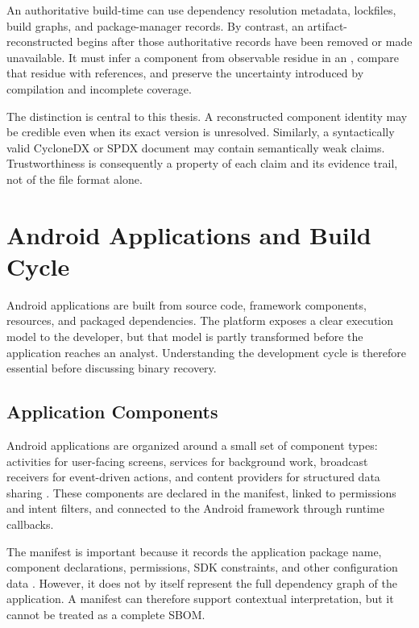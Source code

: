 An authoritative build-time \SBOM can use dependency resolution metadata,
lockfiles, build graphs, and package-manager records. By contrast, an
artifact-reconstructed \SBOM begins after those authoritative records have
been removed or made unavailable. It must infer a component from observable
residue in an \APK, compare that residue with references, and preserve the
uncertainty introduced by compilation and incomplete coverage.

The distinction is central to this thesis. A reconstructed component identity
may be credible even when its exact version is unresolved. Similarly, a
syntactically valid CycloneDX or SPDX document may contain semantically weak
claims. Trustworthiness is consequently a property of each claim and its
evidence trail, not of the file format alone.

\section{Android Applications and Build Cycle}

Android applications are built from source code, framework components,
resources, and packaged dependencies. The platform exposes a clear execution
model to the developer, but that model is partly transformed before the
application reaches an analyst. Understanding the development cycle is
therefore essential before discussing binary recovery.

\subsection{Application Components}

Android applications are organized around a small set of component types:
activities for user-facing screens, services for background work, broadcast
receivers for event-driven actions, and content providers for structured data
sharing \cite{androidAppFundamentals}. These components are declared in the
manifest, linked to permissions and intent filters, and connected to the
Android framework through runtime callbacks.

The manifest is important because it records the application package name,
component declarations, permissions, SDK constraints, and other configuration
data \cite{androidManifestOverview}. However, it does not by itself represent
the full dependency graph of the application. A manifest can therefore support
contextual interpretation, but it cannot be treated as a complete SBOM.

